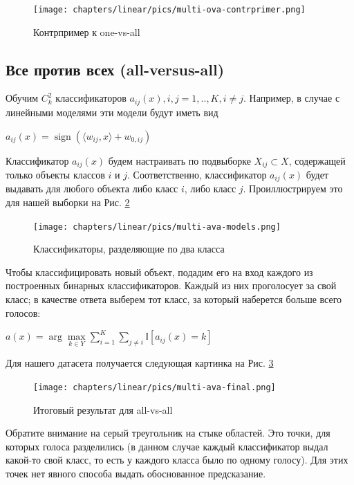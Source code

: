 \begin{itemize}
\begin{figure}[H]
	\centering
	\texttt{[image: chapters/linear/pics/multi-ova-contrprimer.png]}
	\caption{Контрпример к one-vs-all}
	\label{fig:linear-multi-ova-contrprimer}
\end{figure}

\subsection{Все против всех (all-versus-all)}

Обучим  $C^2_k$ классификаторов $a_{ij}(x), i, j = 1,..,K, i \neq j$. Например, в случае с линейными моделями эти модели будут иметь вид

$a_{ij}(x) = \operatorname{sign}(\langle w_{ij}, x \rangle+w_{0,ij})$

Классификатор $a_{ij}(x)$ будем настраивать по подвыборке $X_{ij} \subset X$, содержащей только объекты классов $i$ и $j$. Соответственно, классификатор $a_{ij}(x)$ будет выдавать для любого объекта либо класс $i$, либо класс $j$. Проиллюстрируем это для нашей выборки на Рис. \ref{fig:linear-multi-ava-models}

\begin{figure}[H]
	\centering
	\texttt{[image: chapters/linear/pics/multi-ava-models.png]}
	\caption{Классификаторы, разделяющие по два класса}
	\label{fig:linear-multi-ava-models}
\end{figure}

Чтобы классифицировать новый объект, подадим его на вход каждого из построенных бинарных классификаторов. Каждый из них проголосует за свой класс; в качестве ответа выберем тот класс, за который наберется больше всего голосов:

$a(x) = \operatorname{arg}\max\limits_{k \in Y} \sum\limits_{i=1}^K\sum\limits_{j\neq i} \mathbb{I}[a_{ij}(x) = k]$

Для нашего датасета получается следующая картинка на Рис. \ref{fig:linear-multi-ava-final}

\begin{figure}[H]
	\centering
	\texttt{[image: chapters/linear/pics/multi-ava-final.png]}
	\caption{Итоговый результат для all-vs-all}
	\label{fig:linear-multi-ava-final}
\end{figure}

Обратите внимание на серый треугольник на стыке областей. Это точки, для которых голоса разделились (в данном случае каждый классификатор выдал какой-то свой класс, то есть у каждого класса было по одному голосу). Для этих точек нет явного способа выдать обоснованное предсказание.


\end{itemize}
